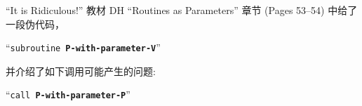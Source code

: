 
\begin{frame}{}
  \begin{exampleblock}{``It is Ridiculous!''}
    教材 DH ``Routines as Parameters'' 章节 (Pages 53--54) 中给了一段伪代码，

    \begin{center}
      {``\texttt{subroutine {\bf P-with-parameter-V}}''}
    \end{center}

    并介绍了如下调用可能产生的问题:

    \begin{center}
      {``\texttt{call {\bf P-with-parameter-P}}''}
    \end{center}

    \begin{center}
    \end{center}
  \end{exampleblock}
\end{frame}
